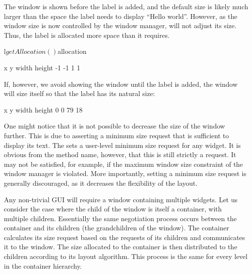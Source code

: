 %
The window is shown before the label is added, and the default size is
likely much larger than the space the label needs to display ``Hello
world''. However, as the window size is now controlled by the window
manager,  will not adjust its size. Thus, the label
is allocated more space than it requires.
\begin{Schunk}
\begin{Sinput}
 l$getAllocation()$allocation
\end{Sinput}
\end{Schunk}
\begin{Schunk}
\begin{Soutput}
     x      y  width height 
    -1     -1      1      1 
\end{Soutput}
\end{Schunk}
%
If, however, we avoid showing the window until the label is added, the
window will size itself so that the label has its natural size:
\begin{Schunk}
\end{Schunk}
\begin{Schunk}
\begin{Soutput}
     x      y  width height 
     0      0     79     18 
\end{Soutput}
\end{Schunk}
%
One might notice that it is not possible to decrease the size of the
window further. This is due to  asserting a minimum
size request that is sufficient to display its text. The
 sets a user-level minimum size 
request for any widget. It is obvious from the method name, however,
that this is still strictly a request. It may not be satisfied, for
example, if the maximum window size constraint of the window manager
is violated. More importantly, setting a minimum size request is
generally discouraged, as it decreases the flexibility of the layout.

Any non-trivial GUI will require a window containing multiple
widgets. Let us consider the case where the child of the window is
itself a container, with multiple children.  Essentially the same
negotiation process occurs between the container and its children (the
grandchildren of the window). The container calculates its size
request based on the requests of its children and communicates it to
the window. The size allocated to the container is then distributed to
the children according to its layout algorithm. This process is the
same for every level in the container hierarchy.

